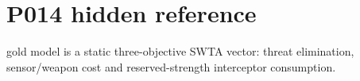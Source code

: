 \section*{P014 hidden reference}\nThe gold model is a static three-objective SWTA vector: threat elimination, sensor/weapon cost and reserved-strength interceptor consumption.\n